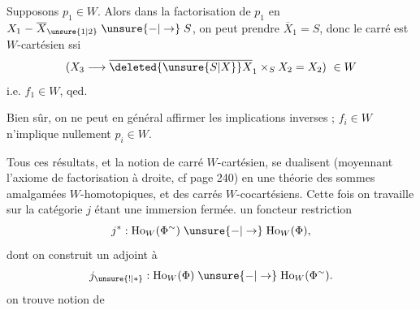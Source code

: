 
Supposons $p_1\in W$. Alors dans la factorisation de $p_1$ en $X_1\mathrel{-}\overline X_{\unsure{1|2}}\mathrel{\unsure{-|\to}} S$, on peut prendre $\overline X_1=S$, donc le carré est $W$-cartésien ssi
\[
(X_3\longrightarrow\overline{\deleted{\unsure{S|X}}X}_1\times_S X_2=X_2)\ \in W
\]
i.e. $f_1\in W$, qed.

Bien sûr, on ne peut en général affirmer les implications inverses ; $f_i\in W$ n'implique nullement $p_i\in W$.

Tous ces résultats, et la notion de carré $W$-cartésien, se dualisent (moyennant l'axiome  de factorisation à droite, cf page 240) en une théorie des sommes amalgamées $W$-homotopiques, et des carrés $W$-cocartésiens. Cette fois on travaille sur la catégorie
$j$ étant une immersion fermée.  un foncteur restriction
\[
j^*:\mathrm{Ho}_W(\Phi^{\sim})\mathrel{\unsure{-|\to}}\mathrm{Ho}_W(\Phi),
\]
dont on construit un adjoint à 
\[
j_{\unsure{!|*}}:\mathrm{Ho}_W(\Phi)\mathrel{\unsure{-|\to}}\mathrm{Ho}_W(\Phi^{\sim}).
\]
on trouve  notion  de
